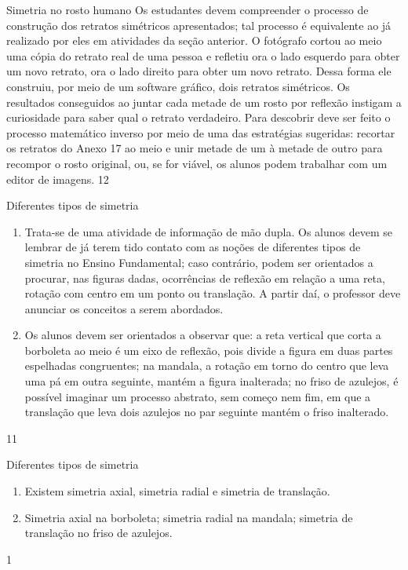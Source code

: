 
\clearmargin
\begin{sugestions}{Simetria no rosto humano}
{
Os estudantes devem compreender o processo de construção dos retratos simétricos apresentados; tal processo é equivalente ao já realizado por eles em atividades da seção anterior. O fotógrafo cortou ao meio uma cópia do retrato real de uma pessoa e refletiu ora o lado esquerdo para obter um novo retrato, ora o lado direito para obter um novo retrato. Dessa forma ele construiu, por meio de um software gráfico, dois retratos simétricos. Os resultados conseguidos ao juntar cada metade de um rosto por reflexão instigam a curiosidade para saber qual o retrato verdadeiro. Para descobrir deve ser feito o processo matemático inverso por meio de uma das estratégias sugeridas: recortar os retratos do Anexo 17 ao meio e unir metade de um à metade de outro para recompor o rosto original, ou, se for viável, os alunos podem trabalhar com um editor de imagens.
}{1}{2}
\end{sugestions}
\clearmargin
\begin{sugestions}{Diferentes tipos de simetria}
{
\begin{enumerate}
\item Trata-se de uma atividade de informação de mão dupla. Os alunos devem se lembrar de já terem tido contato com as noções de diferentes tipos de simetria no Ensino Fundamental; caso contrário, podem ser orientados a procurar, nas figuras dadas, ocorrências de reflexão em relação a uma reta, rotação com centro em um ponto ou translação. A partir daí, o professor deve anunciar os conceitos a serem abordados.
\item Os alunos devem ser orientados a observar que: a reta vertical que corta a borboleta ao meio é um eixo de reflexão, pois divide a figura em duas partes espelhadas congruentes; na mandala, a rotação em torno do centro que leva uma pá em outra seguinte, mantém a figura inalterada; no friso de azulejos, é possível imaginar um processo abstrato, sem começo nem fim, em que a translação que leva dois  azulejos no par seguinte mantém o friso inalterado.
\end{enumerate}
}{1}{1}
\end{sugestions}
\begin{answer}{Diferentes tipos de simetria}
{
\begin{enumerate}
\item Existem simetria axial, simetria radial e simetria de translação.
\item Simetria axial na borboleta; simetria radial na mandala; simetria de translação no friso de azulejos.    
\end{enumerate}
}{1}
\end{answer}

